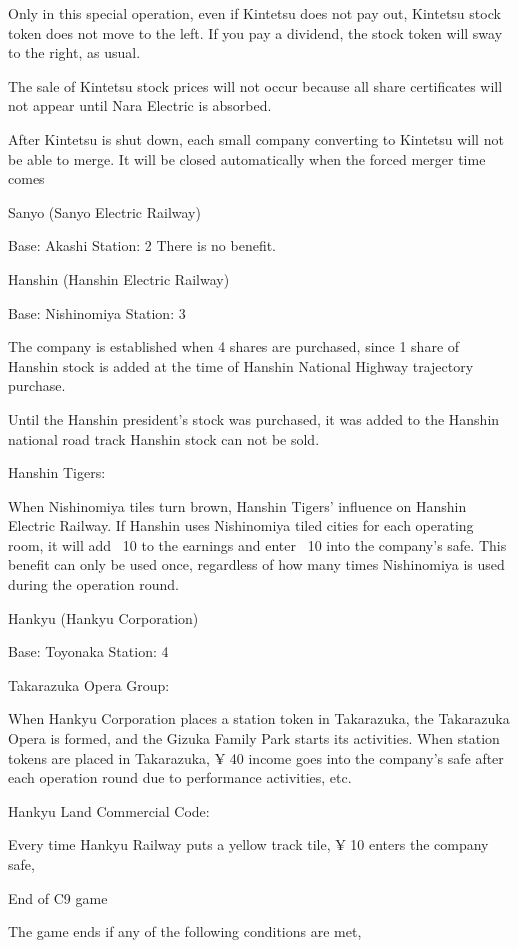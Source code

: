 \documentclass{article}
\begin{document}
\begin{CJK}{UTF8}{min}
Only in this special operation, even if Kintetsu does not pay out, Kintetsu stock token does not move to the left. If you pay a dividend, the stock token will sway to the right, as usual.

The sale of Kintetsu stock prices will not occur because all share certificates will not appear until Nara Electric is absorbed.

After Kintetsu is shut down, each small company converting to Kintetsu will not be able to merge. It will be closed automatically when the forced merger time comes

Sanyo (Sanyo Electric Railway)

Base: Akashi Station: 2
There is no benefit.

Hanshin (Hanshin Electric Railway)

Base: Nishinomiya Station: 3

The company is established when 4 shares are purchased, since 1 share of Hanshin stock is added at the time of Hanshin National Highway trajectory purchase.

Until the Hanshin president's stock was purchased, it was added to the Hanshin national road track
Hanshin stock can not be sold.

Hanshin Tigers:

When Nishinomiya tiles turn brown, Hanshin Tigers' influence on Hanshin Electric Railway. If Hanshin uses Nishinomiya tiled cities for each operating room, it will add \ 10 to the earnings and enter \ 10 into the company's safe. This benefit can only be used once, regardless of how many times Nishinomiya is used during the operation round.

Hankyu (Hankyu Corporation)

Base: Toyonaka Station: 4

Takarazuka Opera Group:

When Hankyu Corporation places a station token in Takarazuka, the Takarazuka Opera is formed, and the Gizuka Family Park starts its activities. When station tokens are placed in Takarazuka, ¥ 40 income goes into the company's safe after each operation round due to performance activities, etc.

Hankyu Land Commercial Code:

Every time Hankyu Railway puts a yellow track tile, ¥ 10 enters the company safe,

End of C9 game

The game ends if any of the following conditions are met,


\end{CJK}
\end{document}
